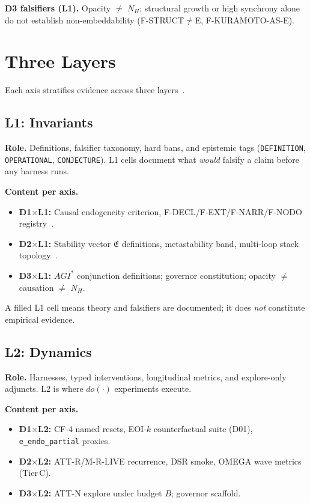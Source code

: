 \documentclass[11pt,a4paper]{article}
\theoremstyle{definition}
\begin{document}
\textbf{D3 falsifiers (L1).} Opacity $\neq$ $N_H$; structural growth or high synchrony alone do not establish non-embeddability (F-STRUCT$\neq$E, F-KURAMOTO-AS-E).

\section{Three Layers}\label{sec:layers}

Each axis stratifies evidence across three layers~\cite{kuznetsov2026cube}.

\subsection{L1: Invariants}

\textbf{Role.} Definitions, falsifier taxonomy, hard bans, and epistemic tags (\texttt{DEFINITION}, \texttt{OPERATIONAL}, \texttt{CONJECTURE}). L1 cells document what \emph{would} falsify a claim before any harness runs.

\textbf{Content per axis.}
\begin{itemize}[leftmargin=*]
\item \textbf{D1$\times$L1:} Causal endogeneity criterion, F-DECL/F-EXT/F-NARR/F-NODO registry~\cite{kuznetsov2026causal}.
\item \textbf{D2$\times$L1:} Stability vector $\mathfrak{E}$ definitions, metastability band, multi-loop stack topology~\cite{kuznetsov2026stable}.
\item \textbf{D3$\times$L1:} $AGI^{*}$ conjunction definitions; governor constitution; opacity $\neq$ causation $\neq$ $N_H$.
\end{itemize}

A filled L1 cell means theory and falsifiers are documented; it does \emph{not} constitute empirical evidence.

\subsection{L2: Dynamics}

\textbf{Role.} Harnesses, typed interventions, longitudinal metrics, and explore-only adjuncts. L2 is where $do(\cdot)$ experiments execute.

\textbf{Content per axis.}
\begin{itemize}[leftmargin=*]
\item \textbf{D1$\times$L2:} CF-4 named resets, EOI-$k$ counterfactual suite (D01), \texttt{e\_endo\_partial} proxies.
\item \textbf{D2$\times$L2:} ATT-R/M-R-LIVE recurrence, DSR smoke, OMEGA wave metrics (Tier\,C).
\item \textbf{D3$\times$L2:} ATT-N explore under budget $B$; governor scaffold.
\end{itemize}
\end{document}
